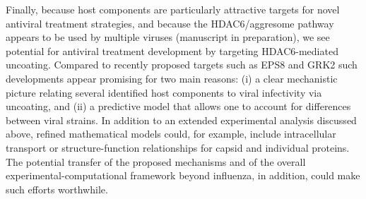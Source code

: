 Finally, because host components are particularly attractive targets for novel antiviral treatment strategies, and because the HDAC6/aggresome pathway appears to be used by multiple viruses (manuscript in preparation), we see potential for antiviral treatment development by targeting HDAC6-mediated uncoating. Compared to recently proposed targets such as EPS8 \cite{larson2019eps8} and GRK2 \cite{yanguez2018phosphoproteomic} such developments appear promising for two main reasons: (i) a clear mechanistic picture relating several identified host components to viral infectivity via uncoating, and (ii) a predictive model that allows one to account for differences between viral strains. In addition to an extended experimental analysis discussed above, refined mathematical models could, for example, include intracellular transport or structure-function relationships for capsid and individual proteins. The potential transfer of the proposed mechanisms and of the overall experimental-computational framework beyond influenza, in addition, could make such efforts worthwhile.
